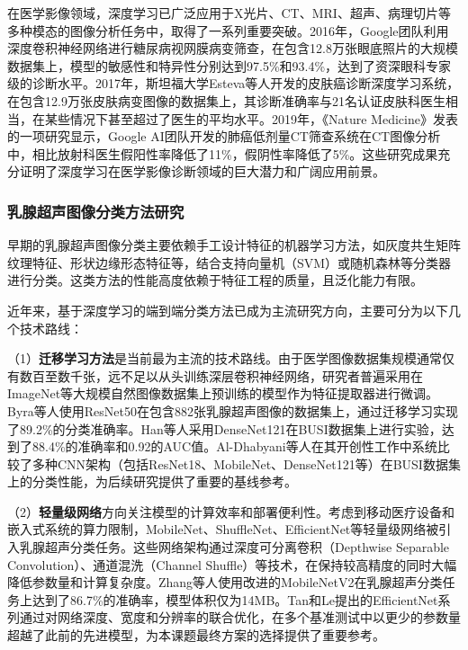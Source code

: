 在医学影像领域，深度学习已广泛应用于X光片、CT、MRI、超声、病理切片等多种模态的图像分析任务中，取得了一系列重要突破。2016年，Google团队利用深度卷积神经网络进行糖尿病视网膜病变筛查，在包含12.8万张眼底照片的大规模数据集上，模型的敏感性和特异性分别达到97.5\%和93.4\%，达到了资深眼科专家级的诊断水平\cite{gulshan2016development}。2017年，斯坦福大学Esteva等人开发的皮肤癌诊断深度学习系统，在包含12.9万张皮肤病变图像的数据集上，其诊断准确率与21名认证皮肤科医生相当，在某些情况下甚至超过了医生的平均水平\cite{esteva2017dermatologist}。2019年，《Nature Medicine》发表的一项研究显示，Google AI团队开发的肺癌低剂量CT筛查系统在CT图像分析中，相比放射科医生假阳性率降低了11\%，假阴性率降低了5\%\cite{afridi2018deep}。这些研究成果充分证明了深度学习在医学影像诊断领域的巨大潜力和广阔应用前景。

\subsubsection{乳腺超声图像分类方法研究}

早期的乳腺超声图像分类主要依赖手工设计特征的机器学习方法，如灰度共生矩阵纹理特征、形状边缘形态特征等，结合支持向量机（SVM）或随机森林等分类器进行分类。这类方法的性能高度依赖于特征工程的质量，且泛化能力有限。

近年来，基于深度学习的端到端分类方法已成为主流研究方向，主要可分为以下几个技术路线：

（1）\textbf{迁移学习方法}是当前最为主流的技术路线。由于医学图像数据集规模通常仅有数百至数千张，远不足以从头训练深层卷积神经网络，研究者普遍采用在ImageNet等大规模自然图像数据集上预训练的模型作为特征提取器进行微调。Byra等人\cite{byra2019breast}使用ResNet50在包含882张乳腺超声图像的数据集上，通过迁移学习实现了89.2\%的分类准确率。Han等人\cite{han2020classification}采用DenseNet121在BUSI数据集上进行实验，达到了88.4\%的准确率和0.92的AUC值。Al-Dhabyani等人\cite{aldhabyani2020dataset}在其开创性工作中系统比较了多种CNN架构（包括ResNet18、MobileNet、DenseNet121等）在BUSI数据集上的分类性能，为后续研究提供了重要的基线参考。

（2）\textbf{轻量级网络}方向关注模型的计算效率和部署便利性。考虑到移动医疗设备和嵌入式系统的算力限制，MobileNet、ShuffleNet、EfficientNet等轻量级网络被引入乳腺超声分类任务。这些网络架构通过深度可分离卷积（Depthwise Separable Convolution）、通道混洗（Channel Shuffle）等技术，在保持较高精度的同时大幅降低参数量和计算复杂度。Zhang等人\cite{zhang2021lightweight}使用改进的MobileNetV2在乳腺超声分类任务上达到了86.7\%的准确率，模型体积仅为14MB。Tan和Le\cite{tan2019efficientnet}提出的EfficientNet系列通过对网络深度、宽度和分辨率的联合优化，在多个基准测试中以更少的参数量超越了此前的先进模型，为本课题最终方案的选择提供了重要参考。


